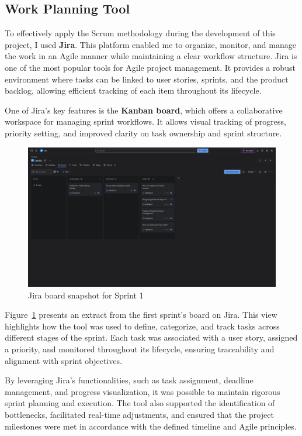 \subsection{Work Planning Tool}

To effectively apply the Scrum methodology during the development of this project, I used \textbf{Jira}. This platform enabled me to organize, monitor, and manage the work in an Agile manner while maintaining a clear workflow structure. Jira is one of the most popular tools for Agile project management. It provides a robust environment where tasks can be linked to user stories, sprints, and the product backlog, allowing efficient tracking of each item throughout its lifecycle.

One of Jira’s key features is the \textbf{Kanban board}, which offers a collaborative workspace for managing sprint workflows. It allows visual tracking of progress, priority setting, and improved clarity on task ownership and sprint structure.

\begin{figure}[H]
  \centering
  \includegraphics[width=\textwidth]{images/jira_board_sprint_1.png}
  \caption{Jira board snapshot for Sprint 1}
  \label{fig:jira_board_sprint1}
\end{figure}

Figure~\ref{fig:jira_board_sprint1} presents an extract from the first sprint’s board on Jira. This view highlights how the tool was used to define, categorize, and track tasks across different stages of the sprint. Each task was associated with a user story, assigned a priority, and monitored throughout its lifecycle, ensuring traceability and alignment with sprint objectives.

By leveraging Jira’s functionalities, such as task assignment, deadline management, and progress visualization, it was possible to maintain rigorous sprint planning and execution. The tool also supported the identification of bottlenecks, facilitated real-time adjustments, and ensured that the project milestones were met in accordance with the defined timeline and Agile principles.
